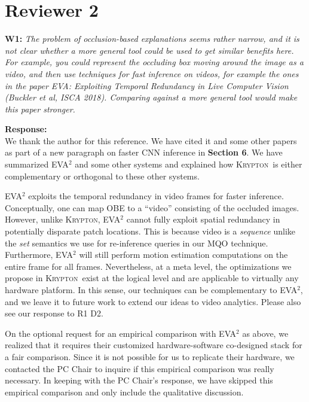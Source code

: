 \documentclass[preprint]{vldb}
\newcommand{\system}{\textsc{Krypton}}
\begin{document}
\section{Reviewer 2}

\vspace{2mm}
\noindent \textbf{W1:} \textit{The problem of occlusion-based explanations seems rather narrow, and it is not clear whether a more general tool could be used to get similar benefits here. For example, you could represent the occluding box moving around the image as a video, and then use techniques for fast inference on videos, for example the ones in the paper EVA: Exploiting Temporal Redundancy in Live Computer Vision (Buckler et al, ISCA 2018). Comparing against a more general tool would make this paper stronger.}

\vspace{2mm}
\noindent \textbf{Response:}\\
We thank the author for this reference. We have cited it and some other papers as part of a new paragraph on faster CNN inference in \textbf{Section 6}. We have summarized EVA$^2$ and some other systems and explained how \system ~is either complementary or orthogonal to these other systems.

EVA$^2$ exploits the temporal redundancy in video frames for faster inference. Conceptually, one can map OBE to a ``video'' consisting of the occluded images. However, unlike \system, EVA$^2$ cannot fully exploit spatial redundancy in potentially disparate patch locations. This is because video is a \textit{sequence} unlike the \textit{set} semantics we use for re-inference queries in our MQO technique. Furthermore, EVA$^2$ will still perform motion estimation computations on the entire frame for all frames. Nevertheless, at a meta level, the optimizations we propose in \system ~exist at the logical level and are applicable to virtually any hardware platform. In this sense, our techniques can be complementary to EVA$^2$, and we leave it to future work to extend our ideas to video analytics. Please also see our response to R1 D2.

On the optional request for an empirical comparison with EVA$^2$ as above, we realized that it requires their customized hardware-software co-designed stack for a fair comparison. Since it is not possible for us to replicate their hardware, we contacted the PC Chair to inquire if this empirical comparison was really necessary. In keeping with the PC Chair's response, we have skipped this empirical comparison and only include the qualitative discussion.
\end{document}
